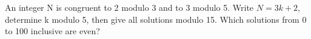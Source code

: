 \documentclass[11pt]{article}
\begin{document}
An integer N is congruent to 2 modulo 3 and to 3 modulo 5. Write \(N = 3k + 2\), determine k modulo 5, then give all solutions modulo 15. Which solutions from 0 to 100 inclusive are even?\par
\vspace{5pt}
\end{document}
